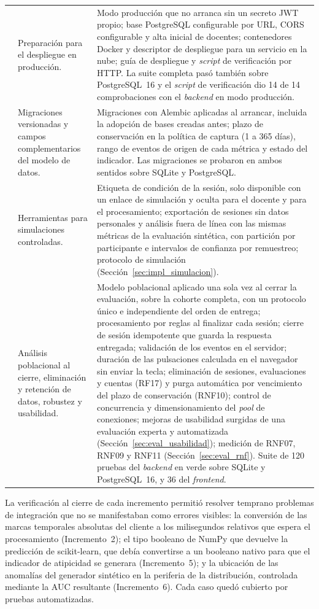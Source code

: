 {\begin{longtable}{>{\raggedright\arraybackslash}p{1.1cm} >{\raggedright\arraybackslash}p{3.7cm} >{\raggedright\arraybackslash}p{8.9cm}}
    13 & Preparación para el despliegue en producción. & Modo producción que no arranca sin un secreto JWT propio; base PostgreSQL configurable por URL, CORS configurable y alta inicial de docentes; contenedores Docker y descriptor de despliegue para un servicio en la nube; guía de despliegue y \textit{script} de verificación por HTTP. La suite completa pasó también sobre PostgreSQL~16 y el \textit{script} de verificación dio 14 de 14 comprobaciones con el \textit{backend} en modo producción. \\
    14 & Migraciones versionadas y campos complementarios del modelo de datos. & Migraciones con Alembic aplicadas al arrancar, incluida la adopción de bases creadas antes; plazo de conservación en la política de captura (1 a 365 días), rango de eventos de origen de cada métrica y estado del indicador. Las migraciones se probaron en ambos sentidos sobre SQLite y PostgreSQL. \\
    15 & Herramientas para simulaciones controladas. & Etiqueta de condición de la sesión, solo disponible con un enlace de simulación y oculta para el docente y para el procesamiento; exportación de sesiones sin datos personales y análisis fuera de línea con las mismas métricas de la evaluación sintética, con partición por participante e intervalos de confianza por remuestreo; protocolo de simulación (Sección~\ref{sec:impl_simulacion}). \\
    16 & Análisis poblacional al cierre, eliminación y retención de datos, robustez y usabilidad. & Modelo poblacional aplicado una sola vez al cerrar la evaluación, sobre la cohorte completa, con un protocolo único e independiente del orden de entrega; procesamiento por reglas al finalizar cada sesión; cierre de sesión idempotente que guarda la respuesta entregada; validación de los eventos en el servidor; duración de las pulsaciones calculada en el navegador sin enviar la tecla; eliminación de sesiones, evaluaciones y cuentas (RF17) y purga automática por vencimiento del plazo de conservación (RNF10); control de concurrencia y dimensionamiento del \textit{pool} de conexiones; mejoras de usabilidad surgidas de una evaluación experta y automatizada (Sección~\ref{sec:eval_usabilidad}); medición de RNF07, RNF09 y RNF11 (Sección~\ref{sec:eval_rnf}). Suite de 120 pruebas del \textit{backend} en verde sobre SQLite y PostgreSQL~16, y 36 del \textit{frontend}. \\
\end{longtable}
}

La verificación al cierre de cada incremento permitió resolver temprano problemas de integración que no se manifestaban como errores visibles: la conversión de las marcas temporales absolutas del cliente a los milisegundos relativos que espera el procesamiento (Incremento~2); el tipo booleano de NumPy que devuelve la predicción de scikit-learn, que debía convertirse a un booleano nativo para que el indicador de atipicidad se generara (Incremento~5); y la ubicación de las anomalías del generador sintético en la periferia de la distribución, controlada mediante la AUC resultante (Incremento~6). Cada caso quedó cubierto por pruebas automatizadas.

